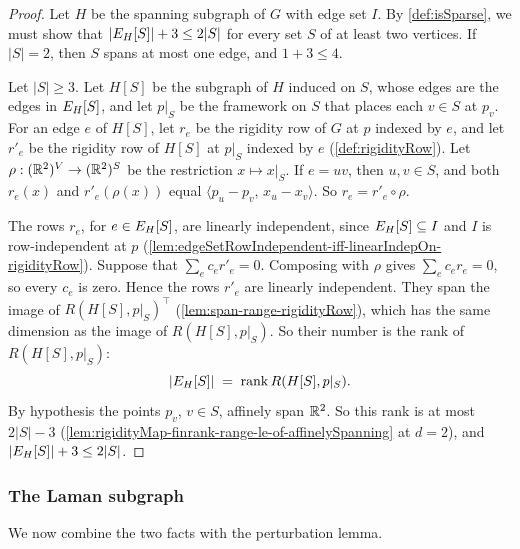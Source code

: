 \begin{proof}
  \leanok
  Let $H$ be the spanning subgraph of $G$ with edge set $I$. By
  \cref{def:isSparse}, we must show that
  $|\edgesIn[H]{S}| + 3 \le 2|S|$ for every set $S$ of at least two
  vertices. If $|S| = 2$, then $S$ spans at most one edge, and
  $1 + 3 \le 4$.

  Let $|S| \ge 3$. Let $H[S]$ be the subgraph of $H$ induced on $S$,
  whose edges are the edges in $\edgesIn[H]{S}$, and let $p|_S$ be the
  framework on $S$ that places each $v \in S$ at $p_v$. For an edge $e$
  of $H[S]$, let $r_e$ be the rigidity row of $G$ at $p$ indexed by
  $e$, and let $r'_e$ be the rigidity row of $H[S]$ at $p|_S$ indexed
  by $e$ (\cref{def:rigidityRow}). Let
  $\rho : (\R^{2})^{V} \to (\R^{2})^{S}$ be the restriction
  $x \mapsto x|_S$. If $e = uv$, then $u, v \in S$, and both $r_e(x)$
  and $r'_e(\rho(x))$ equal $\langle p_u - p_v,\, x_u - x_v \rangle$.
  So $r_e = r'_e \circ \rho$.

  The rows $r_e$, for $e \in \edgesIn[H]{S}$, are linearly independent,
  since $\edgesIn[H]{S} \subseteq I$ and $I$ is row-independent at $p$
  (\cref{lem:edgeSetRowIndependent-iff-linearIndepOn-rigidityRow}).
  Suppose that $\sum_e c_e r'_e = 0$. Composing with $\rho$ gives
  $\sum_e c_e r_e = 0$, so every $c_e$ is zero. Hence the rows $r'_e$
  are linearly independent. They span the image of
  $R(H[S], p|_S)^{\top}$ (\cref{lem:span-range-rigidityRow}), which has
  the same dimension as the image of $R(H[S], p|_S)$. So their number
  is the rank of $R(H[S], p|_S)$:
  \[
    |\edgesIn[H]{S}| \;=\; \operatorname{rank} R(H[S], p|_S).
  \]
  By hypothesis the points $p_v$, $v \in S$, affinely span $\R^{2}$. So
  this rank is at most $2|S| - 3$
  (\cref{lem:rigidityMap-finrank-range-le-of-affinelySpanning} at
  $d = 2$), and $|\edgesIn[H]{S}| + 3 \le 2|S|$.
\end{proof}

\subsubsection{The Laman subgraph}

We now combine the two facts with the perturbation lemma.

